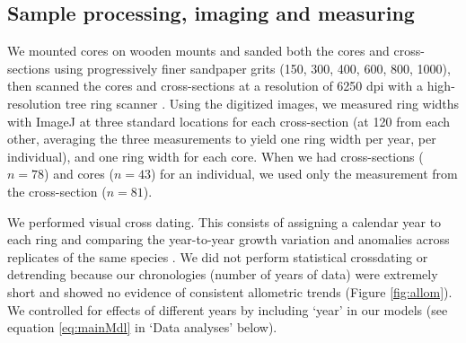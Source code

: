 \documentclass{article}\usepackage[]{graphicx}\usepackage[]{xcolor}
\begin{document}
\subsection*{Sample processing, imaging and measuring}
We mounted cores on wooden mounts and sanded both the cores and cross-sections using progressively finer sandpaper grits (150, 300, 400, 600, 800, 1000), then scanned the cores and cross-sections at a resolution of 6250 dpi with a high-resolution tree ring scanner \citep{fong_tim_2026}. Using the digitized images, we measured ring widths with ImageJ \citep{schneider_nih_2012} at three standard locations for each cross-section (at {120\degree} from each other, averaging the three measurements to yield one ring width per year, per individual), and one ring width for each core. When we had cross-sections ($n = 78$) and cores ($n = 43$) for an individual, we used only the measurement from the cross-section ($n = 81 $). 

We performed visual cross dating. This consists of assigning a calendar year to each ring and comparing the year-to-year growth variation and anomalies across replicates of the same species \citep{stokes_introduction_1996}. We did not perform statistical crossdating or detrending because our chronologies (number of years of data) were extremely short \citep{raden_potential_2020} and showed no evidence of consistent allometric trends (Figure \ref{fig:allom}). We controlled for effects of different years by including `year' in our models (see equation \ref{eq:mainMdl} in `Data analyses' below).
\end{document}
